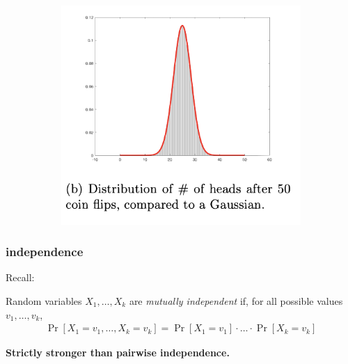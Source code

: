 \documentclass[compress]{beamer}
\begin{document}
\begin{frame}
\begin{figure}
\begin{subfigure}[t]{0.4\textwidth}
			\includegraphics[width=\textwidth]{cltSkinny.png}
		\end{subfigure}
	\end{figure}
\end{frame}

\begin{frame}
	\frametitle{independence}
	Recall:
	\vspace{1em}
	\begin{definition}
		Random variables $X_1, \ldots, X_k$ are \emph{mutually independent} if, for all possible values $v_1, \ldots, v_k$,
		\begin{align*}
			\Pr[X_1 = v_1, \ldots, X_k = v_k] = 	\Pr[X_1 = v_1]\cdot\ldots \cdot\Pr[X_k = v_k]
		\end{align*}
	\end{definition}
	\begin{center}
		\textbf{Strictly stronger than pairwise independence.}
	\end{center}
\end{frame}
\end{document}
